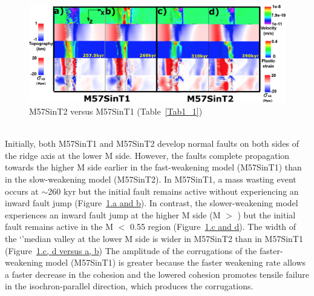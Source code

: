 \begin{figure}[h]
 \centering
  \includegraphics[width=1.0\textwidth]{./Figures/fig_Results_Weakening_2_M57SinT1VST2_CutbackVSsecondaryFault.eps}
 \caption{M57SinT2 versus M57SinT1 (Table~\hyperref[Tab1_1]{\ref{Tab1_1}})}
\label{fig_Results_Weakenging_2}
\end{figure}
~\\
Initially, both M57SinT1 and M57SinT2 develop normal faults on both sides of the ridge axis at the lower M side. However, the faults complete propagation towards the higher M side earlier in the fast-weakening model (M57SinT1) than in the slow-weakening model (M57SinT2). In M57SinT1, a mass wasting event occurs at $\sim$260 kyr but %
the initial fault remains active without experiencing an inward fault jump (Figure~\hyperref[fig_Results_Weakenging_2]{\ref{fig_Results_Weakenging_2}.a and b}). In contrast, the slower-weakening model experiences an inward fault jump at the higher M side (M $>$ ) but the initial fault remains active in the M $<$ 0.55 region (Figure~\hyperref[fig_Results_Weakenging_2]{\ref{fig_Results_Weakenging_2}.c and d}).
The width of the `'median valley at the lower M side is wider in M57SinT2 than in M57SinT1 (Figure~\hyperref[fig_Results_Weakenging_2]{\ref{fig_Results_Weakenging_2}.c, d versus a, b})%
The amplitude of the corrugations of the faster-weakening model (M57SinT1) is greater because the faster weakening rate allows a faster decrease in the cohesion and the lowered cohesion promotes tensile failure in the isochron-parallel direction, which produces the corrugations.

